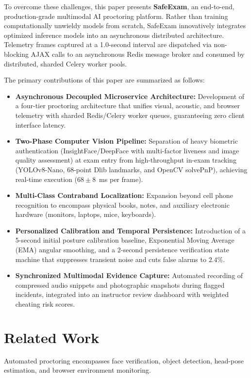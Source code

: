 \documentclass[conference]{IEEEtran}
\begin{document}
To overcome these challenges, this paper presents \textbf{SafeExam}, an end-to-end, production-grade multimodal AI proctoring platform. Rather than training computationally unwieldy models from scratch, SafeExam innovatively integrates optimized inference models into an asynchronous distributed architecture. Telemetry frames captured at a 1.0-second interval are dispatched via non-blocking AJAX calls to an asynchronous Redis message broker and consumed by distributed, sharded Celery worker pools. 

The primary contributions of this paper are summarized as follows:
\begin{itemize}
    \item \textbf{Asynchronous Decoupled Microservice Architecture:} Development of a four-tier proctoring architecture that unifies visual, acoustic, and browser telemetry with sharded Redis/Celery worker queues, guaranteeing zero client interface latency.
    \item \textbf{Two-Phase Computer Vision Pipeline:} Separation of heavy biometric authentication (InsightFace/DeepFace with multi-factor liveness and image quality assessment) at exam entry from high-throughput in-exam tracking (YOLOv8-Nano, 68-point Dlib landmarks, and OpenCV solvePnP), achieving real-time execution ($68 \pm 8$~ms per frame).
    \item \textbf{Multi-Class Contraband Localization:} Expansion beyond cell phone recognition to encompass physical books, notes, and auxiliary electronic hardware (monitors, laptops, mice, keyboards).
    \item \textbf{Personalized Calibration and Temporal Persistence:} Introduction of a 5-second initial posture calibration baseline, Exponential Moving Average (EMA) angular smoothing, and a 2-second persistence verification state machine that suppresses transient noise and cuts false alarms to $2.4\%$.
    \item \textbf{Synchronized Multimodal Evidence Capture:} Automated recording of compressed audio snippets and photographic snapshots during flagged incidents, integrated into an instructor review dashboard with weighted cheating risk scores.
\end{itemize}

\section{Related Work}
Automated proctoring encompasses face verification, object detection, head-pose estimation, and browser environment monitoring.
\end{document}
